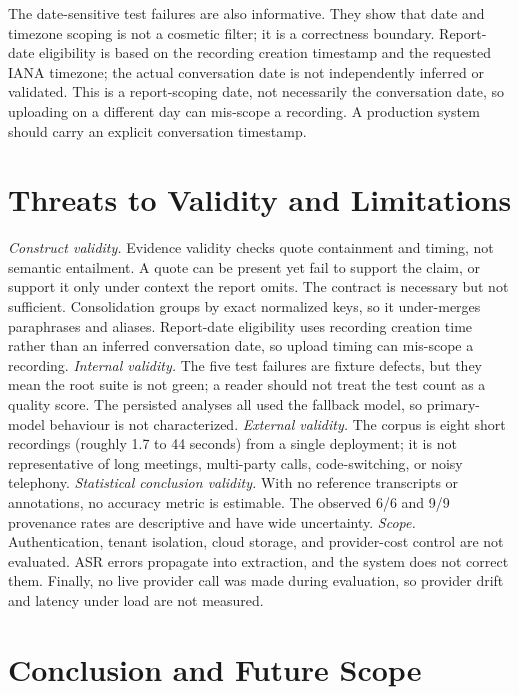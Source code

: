 \documentclass[10pt,a4paper]{article}
\begin{document}
The date-sensitive test failures are also informative. They show that date and timezone
scoping is not a cosmetic filter; it is a correctness boundary. Report-date eligibility is
based on the recording creation timestamp and the requested IANA timezone; the actual
conversation date is not independently inferred or validated. This is a report-scoping
date, not necessarily the conversation date, so uploading on a different day can mis-scope
a recording. A production system should carry an explicit conversation timestamp.

\section{Threats to Validity and Limitations}
\label{sec:threats}

\emph{Construct validity.} Evidence validity checks quote containment and timing, not
semantic entailment. A quote can be present yet fail to support the claim, or support it
only under context the report omits. The contract is necessary but not sufficient.
Consolidation groups by exact normalized keys, so it under-merges paraphrases and aliases.
Report-date eligibility uses recording creation time rather than an inferred conversation
date, so upload timing can mis-scope a recording.
\emph{Internal validity.} The five test failures are fixture defects, but they mean the
root suite is not green; a reader should not treat the test count as a quality score. The
persisted analyses all used the fallback model, so primary-model behaviour is not
characterized. \emph{External validity.} The corpus is eight short recordings (roughly 1.7
to 44 seconds) from a single deployment; it is not representative of long meetings,
multi-party calls, code-switching, or noisy telephony. \emph{Statistical conclusion
validity.} With no reference transcripts or annotations, no accuracy metric is estimable.
The observed 6/6 and 9/9 provenance rates are descriptive and have wide uncertainty.
\emph{Scope.} Authentication, tenant isolation, cloud storage, and provider-cost control
are not evaluated. ASR errors propagate into extraction, and the system does not correct
them. Finally, no live provider call was made during evaluation, so provider drift and
latency under load are not measured.

\section{Conclusion and Future Scope}
\end{document}
